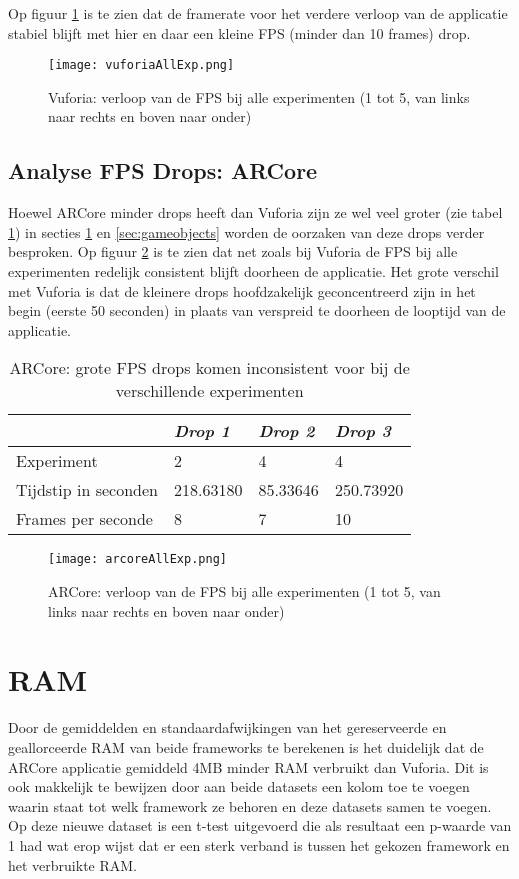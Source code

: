 Op figuur \ref{fig:vuforiaTimeDrop} is te zien dat de framerate voor het verdere verloop van de applicatie stabiel blijft met hier en daar een kleine FPS (minder dan 10 frames) drop.

\begin{figure}
    \texttt{[image: vuforiaAllExp.png]}
    \caption{Vuforia: verloop van de FPS bij alle experimenten (1 tot 5, van links naar rechts en boven naar onder)}
    \label{fig:vuforiaTimeDrop}
\end{figure}

\subsection{Analyse FPS Drops: ARCore}
Hoewel ARCore minder drops heeft dan Vuforia zijn ze wel veel groter (zie tabel \ref{tbl:arcoredrop}) in secties \ref{sec:memory} en \ref{sec:gameobjects} worden de oorzaken van deze drops verder besproken. Op figuur \ref{fig:arcoreTimeDrop} is te zien dat net zoals bij Vuforia de FPS bij alle experimenten redelijk consistent blijft doorheen de applicatie. Het grote verschil met Vuforia is dat de kleinere drops hoofdzakelijk geconcentreerd zijn in het begin (eerste 50 seconden) in plaats van verspreid te doorheen de looptijd van de applicatie. 

\begin{table}
    \centering
    \begin{tabular}{llll} \toprule
        & \textit{Drop 1}    & \textit{Drop 2}   & \textit{Drop 3}    \\ \midrule
        Experiment         & 2         & 4        & 4         \\
        Tijdstip in seconden          & 218.63180 & 85.33646 & 250.73920 \\
        Frames per seconde & 8         & 7        & 10       \\ \bottomrule
    \end{tabular}
    \caption{ARCore: grote FPS drops komen inconsistent voor bij de verschillende experimenten }\label{tbl:arcoredrop}
\end{table}

\begin{figure}
    \texttt{[image: arcoreAllExp.png]}
    \caption{ARCore: verloop van de FPS bij alle experimenten (1 tot 5, van links naar rechts en boven naar onder)}
    \label{fig:arcoreTimeDrop}
\end{figure}

\section{RAM}\label{sec:memory}
Door de gemiddelden en standaardafwijkingen van het gereserveerde en geallorceerde RAM van beide frameworks te berekenen is het duidelijk dat de ARCore applicatie gemiddeld 4MB minder RAM verbruikt dan Vuforia. Dit is ook makkelijk te bewijzen door aan beide datasets een kolom toe te voegen waarin staat tot welk framework ze behoren en deze datasets samen te voegen. Op deze nieuwe dataset is een t-test uitgevoerd die als resultaat een p-waarde van 1 had wat erop wijst dat er een sterk verband is tussen het gekozen framework en het verbruikte RAM.

